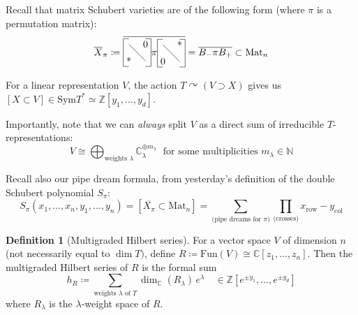 \documentclass[12pt]{amsart}
\numberwithin{equation}{section}
\theoremstyle{definition}
\newtheorem{Definition}[equation]{Definition}
\numberwithin{figure}{section}
\newcommand{\C}{\mathbb{C}}
\newcommand{\bN}{\mathbb{N}}
\newcommand{\Z}{\mathbb{Z}}
\begin{document}

Recall that matrix Schubert varieties are of the following form (where $\pi$ is a permutation matrix): $$\overline{X}_{\pi} \coloneqq \overline{\vcenter{\hbox{\begin{tikzpicture}
\node at (.2,.2) {*};
\node at (.8,.8) {0};
\draw[-] (.2,.8) to (.8,.2);
\draw[-] (0,0) to (0,1);
\draw[-] (0,0) to (.2,0);
\draw[-] (0,1) to (.2,1);
\draw[-] (1,0) to (1,1);
\draw[-] (.8,0) to (1,0);
\draw [-] (.8,1) to (1,1);
\end{tikzpicture}}} \pi 
\vcenter{\hbox{\begin{tikzpicture}
\node at (.2,.2) {0};
\node at (.8,.8) {*};
\draw[-] (.2,.8) to (.8,.2);
\draw[-] (0,0) to (0,1);
\draw[-] (0,0) to (.2,0);
\draw[-] (0,1) to (.2,1);
\draw[-] (1,0) to (1,1);
\draw[-] (.8,0) to (1,0);
\draw [-] (.8,1) to (1,1);
\end{tikzpicture}}}} = \overline{B_- \pi B_+} \subset \text{Mat}_n$$

For a linear representation $V$, the action $T \curvearrowright (V \supset X)$ gives us $[X \subset V] \in \text{Sym}T^{\ast} \simeq \Z[y_1, \dots, y_d]$.

Importantly, note that we can \textit{always} split $V$ as a direct sum of irreducible $T$-representations: \\
$$V \cong \bigoplus_{\text{weights }\lambda} \C_{\lambda}^{\oplus m_{\lambda}} \; \text{ for some multiplicities } m_{\lambda} \in \bN$$


Recall also our pipe dream formula, from yesterday's definition of the double Schubert polynomial $S_{\pi}$:
$$S_{\pi}(x_1, \dots, x_n, y_1, \dots, y_n) = [\overline{X_{\pi}} \subset \text{Mat}_n] = \sum_{\text{(pipe dreams for } \pi)} \prod_{\text{(crosses)}}x_{\text{row}} - y_{\text{col}}$$

\vspace{1em}

\begin{Definition}[Multigraded Hilbert series]
For a vector space $V$ of dimension $n$ (not necessarily equal to $\dim T)$, define $R \coloneqq \text{Fun}(V) \cong \C[z_1, \dots, z_n]$. Then the multigraded Hilbert series of $R$ is the formal sum
$$ h_R \coloneqq \sum_{\text{weights } \lambda \text{ of } T} \dim_{\C}(R_{\lambda})\, e^{\lambda}  \quad \in \mathbb{Z}[e^{\pm y_1}, \dots, e^{\pm y_d}]$$
where $R_{\lambda}$ is the $\lambda$-weight space of $R$.
\end{Definition}
\end{document}
